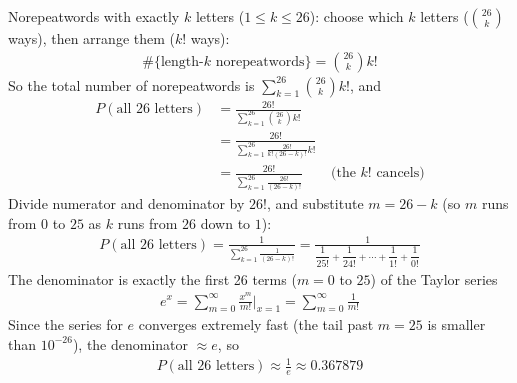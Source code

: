 \documentclass[11pt]{article}
\begin{document}
Norepeatwords with exactly $k$ letters ($1\le k\le 26$): choose which $k$ letters ($\binom{26}{k}$ ways), then arrange them ($k!$ ways):
\begin{align*}
\#\{\text{length-}k\text{ norepeatwords}\} = \binom{26}{k}k!
\end{align*}
So the total number of norepeatwords is $\displaystyle\sum_{k=1}^{26}\binom{26}{k}k!$, and
\begin{align*}
P(\text{all 26 letters}) &= \frac{26!}{\displaystyle\sum_{k=1}^{26}\binom{26}{k}k!}\\
&= \frac{26!}{\displaystyle\sum_{k=1}^{26}\frac{26!}{k!(26-k)!}k!}\\
&= \frac{26!}{\displaystyle\sum_{k=1}^{26}\frac{26!}{(26-k)!}} \qquad \text{(the $k!$ cancels)}
\end{align*}
Divide numerator and denominator by $26!$, and substitute $m=26-k$ (so $m$ runs from $0$ to $25$ as $k$ runs from $26$ down to $1$):
\begin{align*}
P(\text{all 26 letters}) = \frac{1}{\displaystyle\sum_{k=1}^{26}\frac{1}{(26-k)!}} = \frac{1}{\dfrac{1}{25!}+\dfrac{1}{24!}+\cdots+\dfrac{1}{1!}+\dfrac{1}{0!}}
\end{align*}
The denominator is exactly the first 26 terms ($m=0$ to $25$) of the Taylor series
\begin{align*}
e^x = \sum_{m=0}^\infty \frac{x^m}{m!}\Big|_{x=1} = \sum_{m=0}^\infty \frac{1}{m!}
\end{align*}
Since the series for $e$ converges extremely fast (the tail past $m=25$ is smaller than $10^{-26}$), the denominator $\approx e$, so
\begin{align*}
P(\text{all 26 letters}) \approx \frac{1}{e} \approx 0.367879
\end{align*}

\end{document}
